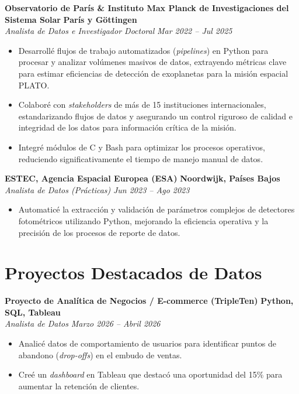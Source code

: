 \documentclass[10pt,a4paper]{article}
\begin{document}
\textbf{Observatorio de París \& Instituto Max Planck de Investigaciones del Sistema Solar} \hfill \textbf{París y Göttingen} \\
\textit{Analista de Datos e Investigador Doctoral} \hfill \textit{Mar 2022 -- Jul 2025}
\begin{itemize}[leftmargin=1.5em]
    \item Desarrollé flujos de trabajo automatizados (\textit{pipelines}) en Python para procesar y analizar volúmenes masivos de datos, extrayendo métricas clave para estimar eficiencias de detección de exoplanetas para la misión espacial PLATO.
    \item Colaboré con \textit{stakeholders} de más de 15 instituciones internacionales, estandarizando flujos de datos y asegurando un control riguroso de calidad e integridad de los datos para información crítica de la misión.
    \item Integré módulos de C y Bash para optimizar los procesos operativos, reduciendo significativamente el tiempo de manejo manual de datos.
\end{itemize}

\textbf{ESTEC, Agencia Espacial Europea (ESA)} \hfill \textbf{Noordwijk, Países Bajos}\\
\textit{Analista de Datos (Prácticas)}  \hfill \textit{Jun 2023 -- Ago 2023}
\begin{itemize}[leftmargin=1.5em]
    \item Automaticé la extracción y validación de parámetros complejos de detectores fotométricos utilizando Python, mejorando la eficiencia operativa y la precisión de los procesos de reporte de datos.
\end{itemize}

\section*{Proyectos Destacados de Datos}
\textbf{Proyecto de Analítica de Negocios / E-commerce (TripleTen)} \hfill \textbf{Python, SQL, Tableau} \\
\textit{Analista de Datos} \hfill \textit{Marzo 2026 -- Abril 2026}
\begin{itemize}[leftmargin=1.5em]
    \item Analicé datos de comportamiento de usuarios para identificar puntos de abandono (\textit{drop-offs}) en el embudo de ventas.
    \item Creé un \textit{dashboard} en Tableau que destacó una oportunidad del 15\% para aumentar la retención de clientes.
\end{itemize}
\end{document}
